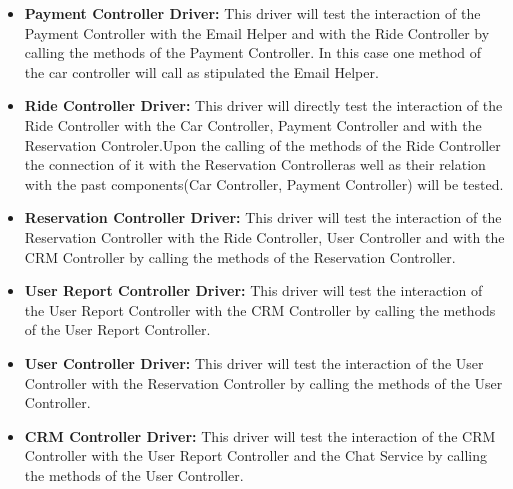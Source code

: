 \documentclass[a4paper]{article}
\begin{document}
\begin{itemize}
\item \textbf{Payment Controller Driver:} This driver will test the interaction of the Payment Controller with the Email Helper and with the Ride Controller by calling the methods of the Payment Controller. In this case one method of the car controller will call as stipulated the Email Helper.  
\item \textbf{Ride Controller Driver:} This driver will directly test the interaction of the Ride Controller with the Car Controller, Payment Controller and with the Reservation Controler.Upon the calling of the methods of the Ride Controller the connection of it with the Reservation Controlleras well as their relation with the past components(Car Controller, Payment Controller) will be tested.
\item \textbf{Reservation Controller Driver:} This driver will test the interaction of the Reservation Controller with the Ride Controller, User Controller and with the CRM Controller by calling the methods of the Reservation Controller. 


\item \textbf{User Report Controller Driver:}  This driver will test the interaction of the User Report Controller with the CRM Controller by calling the methods of the User Report Controller. 

\item \textbf{User Controller Driver:} This driver will test the interaction of the User Controller with the Reservation Controller by calling the methods of the User Controller. 


\item \textbf{CRM Controller Driver: } This driver will test the interaction of the CRM Controller with the User Report Controller and the Chat Service by calling the methods of the User Controller. 
\end{itemize}  
\end{document}

